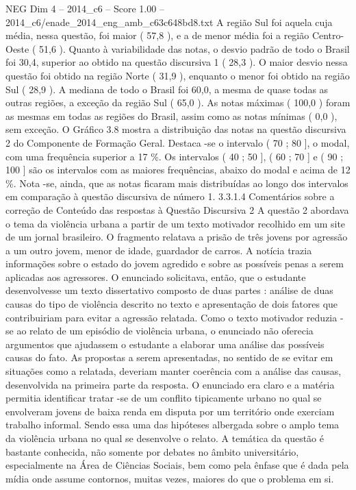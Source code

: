 \begin{textsample}{NEG Dim 4 – 2014\_c6 – Score 1.00 – 2014\_c6/enade\_2014\_eng\_amb\_c63c648bd8.txt}
A região Sul foi aquela cuja média, nessa questão, foi maior ( 57,8 ), e a de menor média foi a região Centro-Oeste ( 51,6 ).
Quanto à variabilidade das notas, o desvio padrão de todo o Brasil foi 30,4, superior ao obtido na questão discursiva 1 ( 28,3 ).
O maior desvio nessa questão foi obtido na região Norte ( 31,9 ), enquanto o menor foi obtido na região Sul ( 28,9 ).
A mediana de todo o Brasil foi 60,0, a mesma de quase todas as outras regiões, a exceção da região Sul ( 65,0 ).
As notas máximas ( 100,0 ) foram as mesmas em todas as regiões do Brasil, assim como as notas mínimas ( 0,0 ), sem exceção.
O Gráfico 3.8 mostra a distribuição das notas na questão discursiva 2 do Componente de Formação Geral.
Destaca -se o intervalo ( 70 ; 80 ], o modal, com uma frequência superior a 17 \%.
Os intervalos ( 40 ; 50 ], ( 60 ; 70 ] e ( 90 ; 100 ] são os intervalos com as maiores frequências, abaixo do modal e acima de 12 \%.
Nota -se, ainda, que as notas ficaram mais distribuídas ao longo dos intervalos em comparação à questão discursiva de número 1. 3.3.1.4 Comentários sobre a correção de Conteúdo das respostas à Questão Discursiva 2 A questão 2 abordava o tema da violência urbana a partir de um texto motivador recolhido em um site de um jornal brasileiro.
O fragmento relatava a prisão de três jovens por agressão a um outro jovem, menor de idade, guardador de carros.
A notícia trazia informações sobre o estado do jovem agredido e sobre as possíveis penas a serem aplicadas aos agressores.
O enunciado solicitava, então, que o estudante desenvolvesse um texto dissertativo composto de duas partes : análise de duas causas do tipo de violência descrito no texto e apresentação de dois fatores que contribuiriam para evitar a agressão relatada.
Como o texto motivador reduzia -se ao relato de um episódio de violência urbana, o enunciado não oferecia argumentos que ajudassem o estudante a elaborar uma análise das possíveis causas do fato.
As propostas a serem apresentadas, no sentido de se evitar em situações como a relatada, deveriam manter coerência com a análise das causas, desenvolvida na primeira parte da resposta.
O enunciado era claro e a matéria permitia identificar tratar -se de um conflito tipicamente urbano no qual se envolveram jovens de baixa renda em disputa por um território onde exerciam trabalho informal.
Sendo essa uma das hipóteses albergada sobre o amplo tema da violência urbana no qual se desenvolve o relato.
A temática da questão é bastante conhecida, não somente por debates no âmbito universitário, especialmente na Área de Ciências Sociais, bem como pela ênfase que é dada pela mídia onde assume contornos, muitas vezes, maiores do que o problema em si.

\end{textsample}
